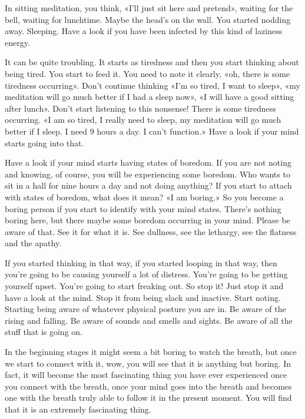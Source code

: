\documentclass[letterpaper,10pt,english]{sphinxmanual}
\begin{document}
\sphinxAtStartPar
In sitting meditation, you think, «I’ll just sit here and pretend», waiting
for the bell, waiting for lunchtime. Maybe the head’s on the wall. You started
nodding away. Sleeping. Have a look if you have been infected by this kind
of laziness energy.

\sphinxAtStartPar
It can be quite troubling. It starts as tiredness and then you start thinking about being tired. You start to feed it. You need to note it clearly, «oh,
there is some tiredness occurring». Don’t continue thinking «I’m so tired, I
want to sleep», «my meditation will go much better if I had a sleep now», «I
will have a good sitting after lunch». Don’t start listening to this nonsense!
There is some tiredness occurring. «I am so tired, I really need to sleep, my
meditation will go much better if I sleep. I need 9 hours a day. I can’t function.» Have a look if your mind starts going into that.

\sphinxAtStartPar
Have a look if your mind starts having states of boredom. If you are
not noting and knowing, of course, you will be experiencing some boredom.
Who wants to sit in a hall for nine hours a day and not doing anything?
If you start to attach
with states of boredom, what does it mean? «I am boring.» So you become a
boring person if you start to identify with your mind states. There’s nothing
boring here, but there maybe some boredom occurring in your mind. Please
be aware of that. See it for what it is. See dullness, see the lethargy, see the
flatness and the apathy.

\sphinxAtStartPar
If you started thinking in that way, if you started looping in that way,
then you’re going to be causing yourself a lot of distress. You’re going to be
getting yourself upset. You’re going to start freaking out. So stop it! Just stop
it and have a look at the mind. Stop it from being slack and inactive. Start
noting.  Starting  being  aware  of  whatever  physical  posture  you  are  in.  Be
aware of the rising and falling. Be aware of sounds and smells and sights. Be
  aware of all the stuff that is going on.

\sphinxAtStartPar
In the beginning stages it might seem a bit boring to watch the breath,
but once we start to connect with it, wow, you will see that it is anything
but boring. In fact, it will become the most fascinating thing you have ever
experienced once you connect with the breath, once your mind goes into the
breath and becomes one with the breath truly able to follow it in the present
moment. You will find that it is an extremely fascinating thing.
\end{document}
